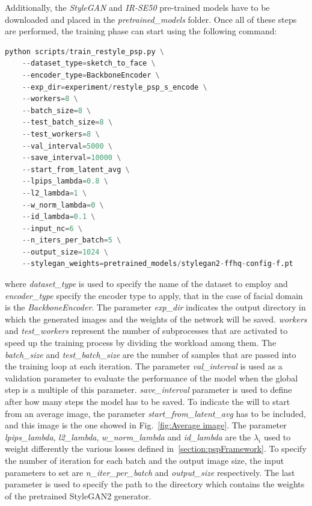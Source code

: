  Additionally, the \textit{StyleGAN} and \textit{IR-SE50} pre-trained models have to be downloaded and placed in the \textit{pretrained\_models} folder.
 Once all of these steps are performed, the training phase can start using the following command:
 \begin{lstlisting}[language=Python, numbers=none]
    python scripts/train_restyle_psp.py \
    --dataset_type=sketch_to_face \
    --encoder_type=BackboneEncoder \
    --exp_dir=experiment/restyle_psp_s_encode \
    --workers=8 \
    --batch_size=8 \
    --test_batch_size=8 \
    --test_workers=8 \
    --val_interval=5000 \
    --save_interval=10000 \
    --start_from_latent_avg \
    --lpips_lambda=0.8 \
    --l2_lambda=1 \
    --w_norm_lambda=0 \
    --id_lambda=0.1 \
    --input_nc=6 \
    --n_iters_per_batch=5 \
    --output_size=1024 \
    --stylegan_weights=pretrained_models/stylegan2-ffhq-config-f.pt
 \end{lstlisting}
where \textit{dataset\_type} is used to specify the name of the dataset to employ and  \textit{encoder\_type} specify the encoder type to apply, that in the case of facial domain is the \textit{BackboneEncoder}. 
The parameter \textit{exp\_dir} indicates the output directory in which the generated images and the weights of the network will be saved. 
\textit{workers} and \textit{test\_workers} represent the number of subprocesses that are activated to speed up the training process by dividing the workload among them. 
The \textit{batch\_size} and \textit{test\_batch\_size} are the number of samples that are passed into the training loop at each iteration. 
The parameter \textit{val\_interval} is used as a validation parameter to evaluate the performance of the model when the global step is a multiple of this parameter. 
\textit{save\_interval} parameter is used to define after how many steps the model has to be saved. To indicate the will to start from an average image, the parameter \textit{start\_from\_latent\_avg} has to be included, and this image is the one showed in Fig.~\ref{fig:Average image}. The parameter \textit{lpips\_lambda}, \textit{l2\_lambda}, \textit{w\_norm\_lambda} and \textit{id\_lambda} are the $\lambda_i$ used to weight differently the various losses defined in~\ref{section:pspFramework}.
To specify the number of iteration for each batch and the output image size, the input parameters to set are \textit{n\_iter\_per\_batch} and \textit{output\_size} respectively. The last parameter is used to specify the path to the directory which contains the weights of the pretrained StyleGAN2 generator.\\
